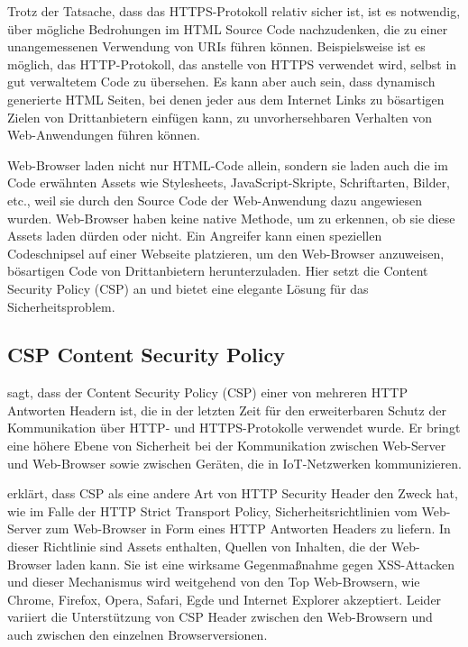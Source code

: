 Trotz der Tatsache, dass das HTTPS-Protokoll relativ sicher ist, ist es notwendig, über mögliche Bedrohungen im HTML Source Code nachzudenken, die zu einer unangemessenen Verwendung von URIs führen können. Beispielsweise ist es möglich, das HTTP-Protokoll, das anstelle von HTTPS verwendet wird, selbst in gut verwaltetem Code zu übersehen. Es kann aber auch sein, dass dynamisch generierte HTML Seiten, bei denen jeder aus dem Internet Links zu bösartigen Zielen von Drittanbietern einfügen kann, zu unvorhersehbaren Verhalten von Web-Anwendungen führen können. \autocite{dolnak2017}

Web-Browser laden nicht nur HTML-Code allein, sondern sie laden auch die im Code erwähnten Assets wie Stylesheets, JavaScript-Skripte, Schriftarten, Bilder, etc., weil sie durch den Source Code der Web-Anwendung dazu angewiesen wurden. Web-Browser haben keine native Methode, um zu erkennen, ob sie diese Assets laden dürden oder nicht. Ein Angreifer kann einen speziellen Codeschnipsel auf einer Webseite platzieren, um den Web-Browser anzuweisen, bösartigen Code von Drittanbietern herunterzuladen. Hier setzt die Content Security Policy (CSP) an und bietet eine elegante Lösung für das Sicherheitsproblem.
\autocite{dolnak2017}

\subsection{CSP Content Security Policy}
\label{subsection:Method1}

\textcite{dolnak2017} sagt, dass der Content Security Policy (CSP) einer von mehreren HTTP Antworten Headern ist, die in der letzten Zeit für den erweiterbaren Schutz der Kommunikation über HTTP- und HTTPS-Protokolle verwendet wurde. Er bringt eine höhere Ebene von Sicherheit bei der Kommunikation zwischen Web-Server und Web-Browser sowie zwischen Geräten, die in IoT-Netzwerken kommunizieren.

\textcite{helme2014} erklärt, dass CSP als eine andere Art von HTTP Security Header den Zweck hat, wie im Falle der HTTP Strict Transport Policy, Sicherheitsrichtlinien vom Web-Server zum Web-Browser in Form eines HTTP Antworten Headers zu liefern. In dieser Richtlinie sind Assets enthalten, Quellen von Inhalten, die der Web-Browser laden kann. Sie ist eine wirksame Gegenmaßnahme gegen XSS-Attacken und dieser Mechanismus wird weitgehend von den Top Web-Browsern, wie Chrome, Firefox, Opera, Safari, Egde und Internet Explorer akzeptiert. Leider variiert die Unterstützung von CSP Header zwischen den Web-Browsern und auch zwischen den einzelnen Browserversionen.

